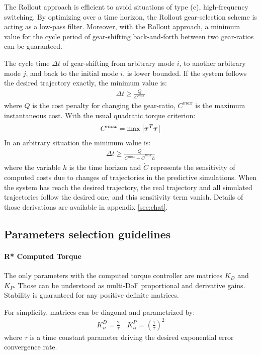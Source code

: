 The Rollout approach is efficient to avoid situations of type (c), high-frequency switching. By optimizing over a time horizon, the Rollout gear-selection scheme is acting as a low-pass filter. Moreover, with the Rollout approach, a minimum value for the cycle period of gear-shifting back-and-forth between two gear-ratios can be guaranteed. 

The cycle time $\Delta t$ of gear-shifting from arbitrary mode $i$, to another arbitrary mode $j$, and back to the initial mode $i$, is lower bounded. If the system follows the desired trajectory exactly, the minimum value is:
%
\begin{align}
\Delta t \geq \frac{Q}{C^{max}}
\label{eq:minshifttime}
\end{align}
%
where $Q$ is the cost penalty for changing the gear-ratio, $C^{max}$ is the maximum instantaneous cost. With the usual quadratic torque criterion:
%
\begin{align}
C^{max} = \operatornamewithlimits{max}\left[ \vec{\tau}^T \vec{\tau} \right]
\end{align}
%
In an arbitrary situation the minimum value is:
%
\begin{align}
\Delta t \geq \frac{ Q }{ C^{max} + \dot{C}^{max} h }
\end{align}
%
where the variable $h$ is the time horizon and $\dot{C}$ represents the sensitivity of computed costs due to changes of trajectories in the predictive simulations. When the system has reach the desired trajectory, the real trajectory and all simulated trajectories follow the desired one, and this sensitivity term vanish. Details of those derivations are available in appendix \ref{sec:chat}.


\subsection{Parameters selection guidelines}

\paragraph{R* Computed Torque} The only parameters with the computed torque controller are matrices $K_D$ and $K_P$. Those can be understood as multi-DoF proportional and derivative gains. Stability is guaranteed for any positive definite matrices.

For simplicity, matrices can be diagonal and parametrized by:
%
\begin{align}
K^D_{ii} = \frac{2}{\tau} \quad   K^P_{ii} = \left(\frac{1}{\tau}\right)^2
\label{eq:ctctau}
\end{align}
%
where $\tau$ is a time constant parameter driving the desired exponential error convergence rate.

